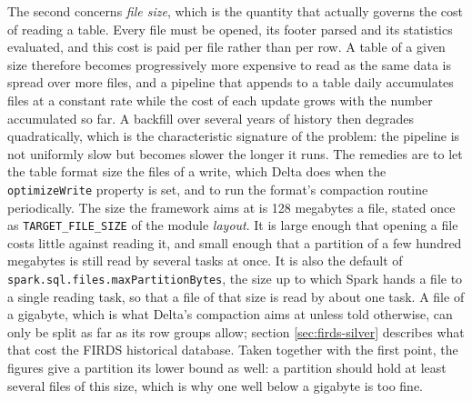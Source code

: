 \documentclass[a4paper, 11pt]{report}
\begin{document}
The second concerns \emph{file size}, which is the quantity that actually governs the cost of reading a table. Every file must be opened, its footer parsed and its statistics evaluated, and this cost is paid per file rather than per row. A table of a given size therefore becomes progressively more expensive to read as the same data is spread over more files, and a pipeline that appends to a table daily accumulates files at a constant rate while the cost of each update grows with the number accumulated so far. A backfill over several years of history then degrades quadratically, which is the characteristic signature of the problem: the pipeline is not uniformly slow but becomes slower the longer it runs. The remedies are to let the table format size the files of a write, which Delta does when the \verb|optimizeWrite| property is set, and to run the format's compaction routine periodically. The size the framework aims at is 128 megabytes a file, stated once as \verb|TARGET_FILE_SIZE| of the module \emph{layout}. It is large enough that opening a file costs little against reading it, and small enough that a partition of a few hundred megabytes is still read by several tasks at once. It is also the default of \verb|spark.sql.files.maxPartitionBytes|, the size up to which Spark hands a file to a single reading task, so that a file of that size is read by about one task. A file of a gigabyte, which is what Delta's compaction aims at unless told otherwise, can only be split as far as its row groups allow; section \ref{sec:firds-silver} describes what that cost the FIRDS historical database. Taken together with the first point, the figures give a partition its lower bound as well: a partition should hold at least several files of this size, which is why one well below a gigabyte is too fine.
\end{document}
